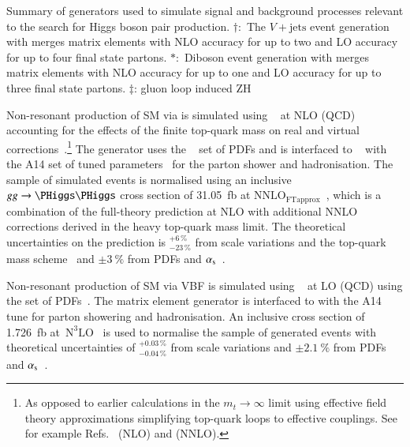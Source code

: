 \begin{sidewaystable}[p]
  \centering

  \caption{Summary of generators used to simulate signal and
    background processes relevant to the search for Higgs boson pair
    production. $\dagger$:~The $V+\text{jets}$ event generation with
    \SHERPA[2.2.1] merges matrix elements with NLO accuracy for up to
    two and LO accuracy for up to four final state partons.
    $*$:~Diboson event generation with \SHERPA[2.2.1] merges matrix
    elements with NLO accuracy for up to one and LO accuracy for up to
    three final state partons. $\ddag$: gluon loop induced ZH }%
  \label{tab:monte_carlo}

  \resizebox{\textwidth}{!}{}
\end{sidewaystable}

Non-resonant production of SM \HH via \ggF is simulated using
\POWHEGBOX[v2]~\cite{Nason:2004rx,Frixione:2007vw,Alioli:2010xd} at
NLO (QCD) accounting for the effects of the finite top-quark mass on
real and virtual
corrections~\cite{Borowka:2016ehy,Baglio:2018lrj,Heinrich:2017kxx}.\footnote{As
  opposed to earlier calculations in the $m_{t} \to \infty$ limit
  using effective field theory approximations simplifying top-quark
  loops to effective couplings. See for example
  Refs.~\cite{Dawson:1998py} (NLO) and \cite{deFlorian:2013jea}
  (NNLO).} The generator uses the
\PDFforLHC[15nlo]~\cite{Butterworth:2015oua} set of PDFs and is
interfaced to \PYTHIA[8]~\cite{Sjostrand:2014zea} with the A14 set of
tuned parameters~\cite{ATL-PHYS-PUB-2014-021} for the parton shower
and hadronisation. The sample of simulated events is normalised using
an inclusive $gg \to \HH$ cross section of \SI{31.05}{\femto\barn} at
$\text{NNLO}_{\text{FTapprox}}$~\cite{Grazzini:2018bsd}, which is a
combination of the full-theory prediction at NLO with additional NNLO
corrections derived in the heavy top-quark mass limit. The theoretical
uncertainties on the prediction is $^{+6\,\%}_{-23\,\%}$ from scale
variations and the top-quark mass scheme~\cite{Baglio:2020wgt} and
$\pm\SI{3}{\percent}$ from PDFs and $\alpha_{\text{s}}$~\cite{LHCHWGHH}.

Non-resonant production of SM \HH via VBF is simulated using
\MGNLO~\cite{Alwall:2014hca} %
at LO (QCD) %
using the \NNPDF[3.0nlo] set of PDFs~\cite{Ball:2014uwa}. The matrix
element generator is interfaced to \PYTHIA[8] with the A14 tune for
parton showering and hadronisation. An inclusive cross section of
\SI{1.726}{\femto\barn}
at~$\text{N}^3\text{LO}$~\cite{Dreyer:2018qbw,LHCHWGHH} is used to
normalise the sample of generated events with theoretical
uncertainties of $^{+0.03\,\%}_{-0.04\,\%}$ from scale variations and
$\pm\SI{2.1}{\percent}$ from PDFs and $\alpha_{\text{s}}$~\cite{LHCHWGHH}.

